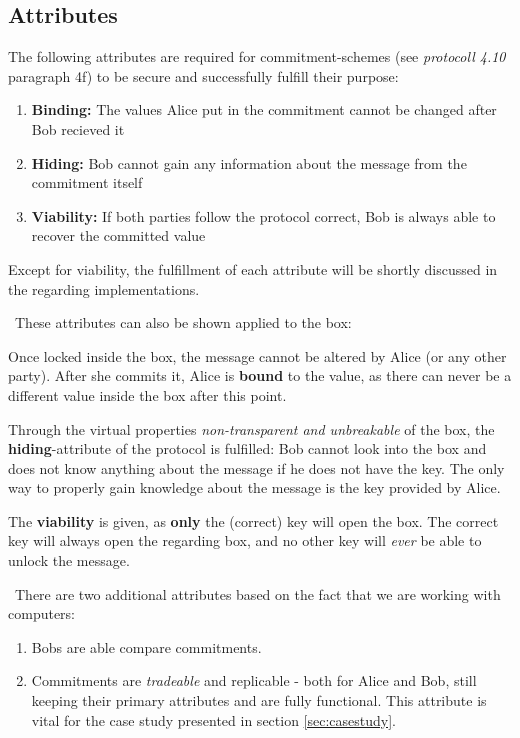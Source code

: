 \subsection{Attributes}
The following attributes are required for commitment-schemes (see \cite{DeHa15} \textit{protocoll 4.10} paragraph 4f) to be secure and successfully fulfill their purpose:

\begin{enumerate}
	\item \textbf{Binding:} The values Alice put in the commitment cannot be changed after Bob recieved it 
	\item \textbf{Hiding:} Bob cannot gain any information about the message from the commitment itself
	\item \textbf{Viability:} If both parties follow the protocol correct, Bob is always able to recover the committed value
\end{enumerate}
Except for viability, the fulfillment of each attribute will be shortly discussed in the regarding implementations. 

~\newline These attributes can also be shown applied to the box: 

Once locked inside the box, the message cannot be altered by Alice (or any other party). After she commits it, Alice is \textbf{bound} to the value, as there can never be a different value inside the box after this point. 

Through the virtual properties \textit{non-transparent and unbreakable} of the box, the \textbf{hiding}-attribute of the protocol is fulfilled: Bob cannot look into the box and does not know anything about the message if he does not have the key. The only way to properly gain knowledge about the message is the key provided by Alice. 

The \textbf{viability} is given, as \textbf{only} the (correct) key will open the box. The correct key will always open the regarding box, and no other key will \textit{ever} be able to unlock the message. 

~\newline There are two additional attributes based on the fact that we are working with computers:
\begin{enumerate}
	\item Bobs are able compare commitments.
	\item Commitments are \textit{tradeable} and replicable - both for Alice and Bob, still keeping their primary attributes and are fully functional. This attribute is vital for the case study presented in section \ref{sec:casestudy}.
\end{enumerate}

